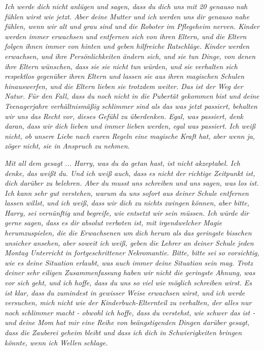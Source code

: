 \emph{Ich werde dich nicht anlügen und sagen, dass du dich uns mit 20 genauso
nah fühlen wirst wie jetzt. Aber deine Mutter und ich werden uns dir genauso
nahe fühlen, wenn wir alt und grau sind und die Roboter im Pflegeheim nerven.
Kinder werden immer erwachsen und entfernen sich von ihren Eltern, und die
Eltern folgen ihnen immer von hinten und geben hilfreiche Ratschläge. Kinder
werden erwachsen, und ihre Persönlichkeiten ändern sich, und sie tun Dinge, von
denen ihre Eltern wünschen, dass sie sie nicht tun würden, und sie verhalten
sich respektlos gegenüber ihren Eltern und lassen sie aus ihren magischen
Schulen hinauswerfen, und die Eltern lieben sie trotzdem weiter. Das ist der Weg
der Natur. Für den Fall, dass du noch nicht in die Pubertät gekommen bist und
deine Teenagerjahre verhältnismäßig schlimmer sind als das was jetzt passiert,
behalten wir uns das Recht vor, dieses Gefühl zu überdenken. Egal, was passiert,
denk daran, dass wir dich lieben und immer lieben werden, egal was passiert. Ich
weiß nicht, ob unsere Liebe nach euren Regeln eine magische Kraft hat, aber wenn
ja, zöger nicht, sie in Anspruch zu nehmen.}

\emph{Mit all dem gesagt ... Harry, was du da getan hast, ist nicht akzeptabel.
Ich denke, das weißt du. Und ich weiß auch, dass es nicht der richtige Zeitpunkt
ist, dich darüber zu belehren. Aber du musst uns schreiben und uns sagen, was
los ist. Ich kann sehr gut verstehen, warum du uns sofort aus deiner Schule
entfernen lassen willst, und ich weiß, dass wir dich zu nichts zwingen können,
aber bitte, Harry, sei vernünftig und begreife, wie entsetzt wir sein müssen.
Ich würde dir gerne sagen, dass es dir absolut verboten ist, mit irgendwelcher
Magie herumzuspielen, die die Erwachsenen um dich herum als das geringste
bisschen unsicher ansehen, aber soweit ich weiß, geben die Lehrer an deiner
Schule jeden Montag Unterricht in fortgeschrittener Nekromantie. Bitte, bitte
sei so vorsichtig, wie es deine Situation erlaubt, was auch immer deine
Situation sein mag. Trotz deiner sehr eiligen Zusammenfassung haben wir nicht
die geringste Ahnung, was vor sich geht, und ich hoffe, dass du uns so viel wie
möglich schreiben wirst. Es ist klar, dass du zumindest in gewisser Weise
erwachsen wirst, und ich werde versuchen, mich nicht wie der
Kinderbuch-Elternteil zu verhalten, der alles nur noch schlimmer macht - obwohl
ich hoffe, dass du verstehst, wie schwer das ist - und deine Mom hat mir eine
Reihe von beängstigenden Dingen darüber gesagt, dass die Zauberei geheim bleibt
und dass ich dich in Schwierigkeiten bringen könnte, wenn ich Wellen schlage.}

